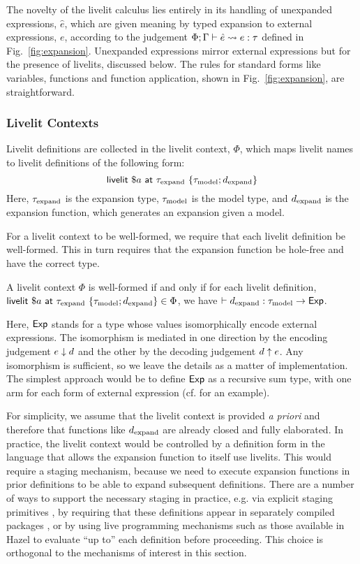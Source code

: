 The novelty of the livelit calculus lies entirely in its handling of unexpanded expressions,
$\hat e$, which are given meaning by typed expansion to external expressions,
$e$, according to the judgement $\Phi; \Gamma \vdash \hat e \leadsto e : \tau$
defined in Fig.~\ref{fig:expansion}.
Unexpanded expressions mirror external expressions but for the presence of livelits, discussed below.
The rules for standard
forms like variables, functions and function application, shown in Fig.~\ref{fig:expansion},
are straightforward.

\subsubsection{Livelit Contexts}
Livelit definitions are collected in the livelit context, $\Phi$, which
maps livelit names to livelit definitions of the following form:
\[ \mathsf{livelit}~\$a~\mathsf{at}~\tau_\text{expand}~\{\tau_\text{model}; d_\text{expand}\} \]
Here, $\tau_\text{expand}$ is the expansion type, $\tau_\text{model}$ is the model type,
and $d_\text{expand}$ is the expansion function, which generates an expansion given a model.

For a livelit context to be well-formed, we require that each livelit definition be well-formed.
This in turn requires that the expansion function be hole-free and have the correct type.
\begin{definition}
    A livelit context $\Phi$ is well-formed if and only if for each livelit definition,
    $\mathsf{livelit}~\$a~\mathsf{at}~\tau_\text{expand}~\{\tau_\text{model}; d_\text{expand}\} \in \Phi$,  we have
    $\vdash d_\text{expand} : \tau_\text{model} \rightarrow \mathsf{Exp}$.
\end{definition}
Here, $\mathsf{Exp}$ stands for a type whose values isomorphically encode
external expressions. The isomorphism is mediated in one direction by
the encoding judgement $e \downarrow d$ and the other by the decoding judgement $d \uparrow e$.
Any isomorphism is sufficient, so we leave the details as a matter of implementation.
The simplest approach would be to define $\mathsf{Exp}$ as a recursive sum type,
with one arm for each form of external expression (cf. \cite{TSLs} for an example).

For simplicity, we assume that the livelit context is provided \emph{a priori} and therefore
that functions like $d_\text{expand}$ are already closed and fully elaborated.
In practice, the livelit context would be controlled by a definition form in the language
that allows the expansion function to itself use livelits.
This would require a staging mechanism,
because we need to execute expansion functions in prior definitions to be able to
expand subsequent definitions.
There are a number of ways to support the necessary staging in practice, e.g.
via explicit staging primitives ,
by requiring that these definitions appear in separately compiled packages \cite{TLMs},
or by using live
programming mechanisms such as those available in Hazel
to evaluate ``up to'' each definition before proceeding.
This choice is orthogonal to the mechanisms of interest in this section.

